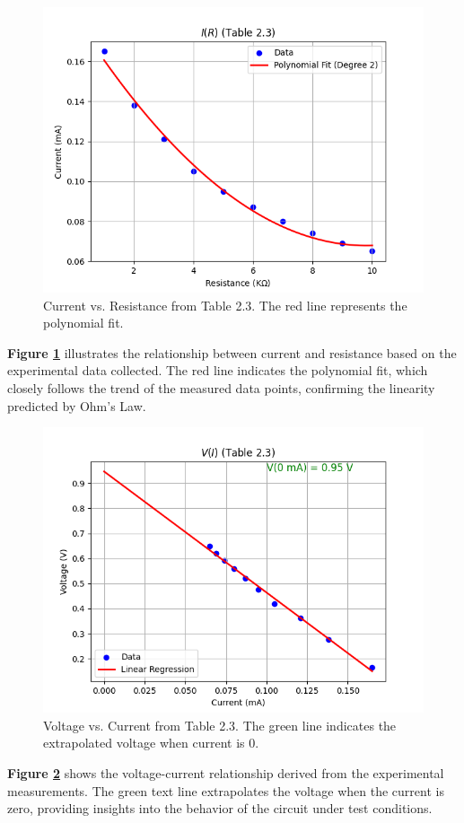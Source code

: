 \documentclass[journal]{IEEEtran}
\begin{document}


\begin{figure}[H]
    \centering
    \includegraphics[width=\linewidth]{output_plots/current_vs_resistance_table_2_3.png}
    \caption{Current vs. Resistance from Table 2.3\cite{lab_manual}. The red line represents the polynomial fit.}
    \label{fig:current_vs_resistance}
\end{figure}
\textbf{Figure \ref{fig:current_vs_resistance}} illustrates the relationship between current and resistance based on the experimental data collected. The red line indicates the polynomial fit, which closely follows the trend of the measured data points, confirming the linearity predicted by Ohm’s Law.

\begin{figure}[H]
    \centering
    \includegraphics[width=\linewidth]{output_plots/Voltage_vs_current_table_2_3.png}
    \caption{Voltage vs. Current from Table 2.3. The green line indicates the extrapolated voltage when current is 0.}
    \label{fig:voltage_vs_current}
\end{figure}
\textbf{Figure \ref{fig:voltage_vs_current}} shows the voltage-current relationship derived from the experimental measurements. The green text line extrapolates the voltage when the current is zero, providing insights into the behavior of the circuit under test conditions.
\end{document}
